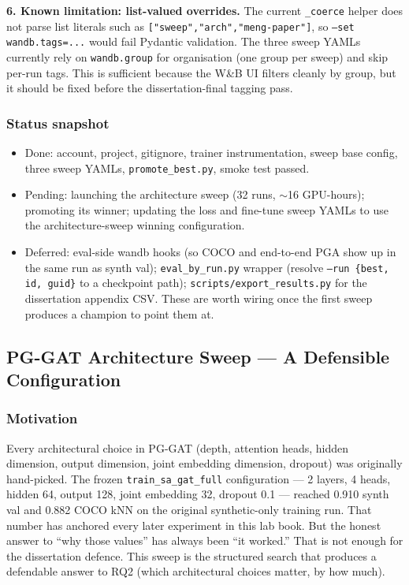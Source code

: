 \textbf{6. Known limitation: list-valued overrides.} The current \texttt{\_coerce} helper does not parse list literals such as \texttt{["sweep","arch","meng-paper"]}, so \texttt{--set wandb.tags=...} would fail Pydantic validation. The three sweep YAMLs currently rely on \texttt{wandb.group} for organisation (one group per sweep) and skip per-run tags. This is sufficient because the W\&B UI filters cleanly by group, but it should be fixed before the dissertation-final tagging pass.

\subsubsection{Status snapshot}

\begin{itemize}
    \item Done: account, project, gitignore, trainer instrumentation, sweep base config, three sweep YAMLs, \texttt{promote\_best.py}, smoke test passed.
    \item Pending: launching the architecture sweep (32 runs, $\sim$16 GPU-hours); promoting its winner; updating the loss and fine-tune sweep YAMLs to use the architecture-sweep winning configuration.
    \item Deferred: eval-side wandb hooks (so COCO and end-to-end PGA show up in the same run as synth val); \texttt{eval\_by\_run.py} wrapper (resolve \texttt{--run \{best, id, guid\}} to a checkpoint path); \texttt{scripts/export\_results.py} for the dissertation appendix CSV. These are worth wiring once the first sweep produces a champion to point them at.
\end{itemize}

\subsection{PG-GAT Architecture Sweep --- A Defensible Configuration}

\subsubsection{Motivation}

Every architectural choice in PG-GAT (depth, attention heads, hidden dimension, output dimension, joint embedding dimension, dropout) was originally hand-picked.
The frozen \texttt{train\_sa\_gat\_full} configuration --- 2 layers, 4 heads, hidden 64, output 128, joint embedding 32, dropout 0.1 --- reached 0.910 synth val and 0.882 COCO kNN on the original synthetic-only training run.
That number has anchored every later experiment in this lab book.
But the honest answer to ``why those values'' has always been ``it worked.''
That is not enough for the dissertation defence.
This sweep is the structured search that produces a defendable answer to RQ2 (which architectural choices matter, by how much).

